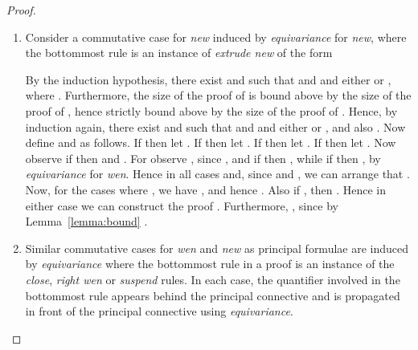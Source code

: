 \begin{proof}
\begin{enumerate}[label=\textbf{\Alph*},ref=\Alph*,leftmargin=*]
\begin{enumerate}[label*=\textbf{.\arabic*}]
Notice that  is the principal connective but the \textit{close} rule is applied to  behind the principal connective.
Thus we desire some formula  such that 
and  and either  or there exists  such that  and , and the size of  is strictly smaller than .
By the induction hypothesis, there exist  and  such that  and  and either  or  and the derivation
 holds.
Furthermore the size of the proof of  is bounded above by the size of the proof of ; hence strictly bounded by the size of the proof of .
Hence, by induction, there exist  and  such that  and  and either  or  the derivation 
 holds.
Observe that if , then 
, since .
If  then 
.
Thereby the following derivation can be constructed, where if  then  and if  then , and also the premise is equivalent to  by \textit{equivariance} for \textit{new}:
.
Furthermore, the following proof can be constructed 

and, by Lemma~\ref{lemma:bound},  hence 
, as required.


\item Consider a commutative case for \textit{new} induced by \textit{equivariance} for \textit{new}, where the bottommost rule is an instance of \textit{extrude new} of the form

By the induction hypothesis, there exist  and  such that  and  and either  or , where
.
Furthermore, the size of the proof of  is bound above by the size of the proof of , hence strictly bound above by the size of the proof of .
Hence, by induction again, there exist  and  such that  and  and either  or , and also .
Now define  and  as follows.
If  then let .
If  then let .
If  then let .
If  then let .
Now observe if  then
 and .
For  observe
, since ,
and if  then ,
while if  then , by \textit{equivariance} for \textit{wen}.
Hence in all cases 
and, since  and , we can arrange that .
Now, for the cases where , we have ,
and hence .
Also if , then . Hence in either case we can construct the proof .
Furthermore, ,
since by Lemma~\ref{lemma:bound} .



\item Similar commutative cases for \textit{wen} and \textit{new} as principal formulae are induced by \textit{equivariance} where the bottommost rule in a proof is an instance of the \textit{close}, \textit{right wen} or \textit{suspend} rules.
In each case, the quantifier involved in the bottommost rule appears behind the principal connective and is propagated in front of the principal connective using \textit{equivariance}.
\end{enumerate}


\end{enumerate}
\end{proof}
